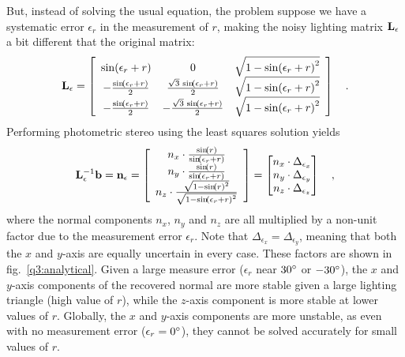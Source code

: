 \documentclass{report}
\begin{document}
But, instead of solving the usual equation, the problem suppose we have a systematic error $\epsilon_r$ in the measurement of $r$, making the noisy lighting matrix $\mathbf{L}_\epsilon$ a bit different that the original matrix:
\begin{equation}
\B{L}_\epsilon = \left[\begin{array}{ccc} \sin\!\left(\epsilon_r + r\right) & 0 & \sqrt{1 - {\sin\!\left(\epsilon_r + r\right)}^2}\\ -\frac{\sin\!\left(\epsilon_r + r\right)}{2} & \frac{\sqrt{3}\, \sin\!\left(\epsilon_r + r\right)}{2} & \sqrt{1 - {\sin\!\left(\epsilon_r + r\right)}^2}\\ -\frac{\sin\!\left(\epsilon_r + r\right)}{2} & -\frac{\sqrt{3}\, \sin\!\left(\epsilon_r + r\right)}{2} & \sqrt{1 - {\sin\!\left(\epsilon_r + r\right)}^2} \end{array}\right]
\quad.
\end{equation}
Performing photometric stereo using the least squares solution yields
\begin{equation}
\mathbf{L}_\epsilon^{-1}\mathbf{b} = \mathbf{n}_\epsilon = 
\left[\begin{array}{c} n_x \cdot \frac{\sin\!\left(r\right)}{\sin\!\left(\epsilon_r + r\right)}\\ n_y \cdot \frac{\sin\!\left(r\right)}{\sin\!\left(\epsilon_r + r\right)}\\ n_z \cdot \frac{\sqrt{1 - {\sin\!\left(r\right)}^2}}{\sqrt{1 - {\sin\!\left(\epsilon_r + r\right)}^2}} \end{array}\right] =
\begin{bmatrix}
n_x \cdot \Delta_{\epsilon_x} \\
n_y \cdot \Delta_{\epsilon_y} \\
n_z \cdot \Delta_{\epsilon_z} \\
\end{bmatrix}
\quad,
\end{equation}
where the normal components $n_x$, $n_y$ and $n_z$ are all multiplied by a non-unit factor due to the measurement error $\epsilon_r$. Note that $\Delta_{\epsilon_x} = \Delta_{\epsilon_y}$, meaning that both the $x$ and $y$-axis are equally uncertain in every case. These factors are shown in fig.~\ref{q3:analytical}. Given a large measure error ($\epsilon_r$ near $30\degree$ or $-30\degree$), the $x$ and $y$-axis components of the recovered normal are more stable given a large lighting triangle (high value of $r$), while the $z$-axis component is more stable at lower values of $r$. Globally, the $x$ and $y$-axis components are more unstable, as even with no measurement error ($\epsilon_r = 0\degree$), they cannot be solved accurately for small values of $r$.
\end{document}
